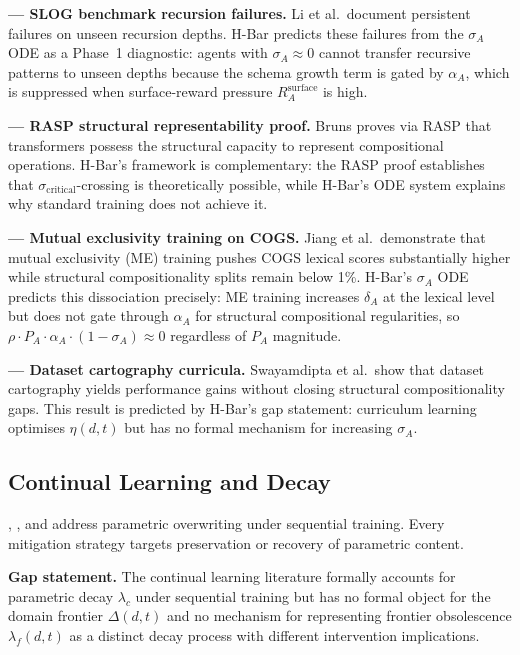 \documentclass[11pt,a4paper]{article}
\begin{document}
\textbf{\cite{li2023slogstructuralgeneralizationbenchmark} --- SLOG benchmark recursion failures.}
Li et al.\ document persistent failures on unseen recursion depths.
H-Bar predicts these failures from the $\sigma_A$ ODE as a Phase~1
diagnostic: agents with $\sigma_A \approx 0$ cannot transfer recursive
patterns to unseen depths because the schema growth term is gated by
$\alpha_A$, which is suppressed when surface-reward pressure
$R_A^{\text{surface}}$ is high.

\textbf{\cite{bruns2025exploringcompositionalgeneralizationin} --- RASP structural representability proof.}
Bruns proves via RASP that transformers possess the structural capacity
to represent compositional operations. H-Bar's framework is
complementary: the RASP proof establishes that
$\sigma_{\text{critical}}$-crossing is theoretically possible, while
H-Bar's ODE system explains why standard training does not achieve it.

\textbf{\cite{jiang2022mutualexclusivity} --- Mutual exclusivity training on COGS.}
Jiang et al.\ demonstrate that mutual exclusivity (ME) training pushes
COGS lexical scores substantially higher while structural
compositionality splits remain below 1\%. H-Bar's $\sigma_A$ ODE
predicts this dissociation precisely: ME training increases
$\delta_A$ at the lexical level but does not gate through $\alpha_A$
for structural compositional regularities, so
$\rho \cdot P_A \cdot \alpha_A \cdot (1 - \sigma_A) \approx 0$
regardless of $P_A$ magnitude.

\textbf{\cite{swayamdipta2020datasetcartography} --- Dataset cartography curricula.}
Swayamdipta et al.\ show that dataset cartography yields performance
gains without closing structural compositionality gaps. This result is
predicted by H-Bar's gap statement: curriculum learning optimises
$\eta(d,t)$ but has no formal mechanism for increasing $\sigma_A$.

\subsection{Continual Learning and Decay}\label{sec:continual-learning}

\cite{mccloskey1989catastrophicinterference},
\cite{goodfellow2013empiricalinvestigationcatastrophicforgetting}, and
\cite{kirkpatrick2017overcomingcatastrophicforgetting} address parametric
overwriting under sequential training. Every mitigation strategy targets
preservation or recovery of parametric content.

\textbf{Gap statement.} The continual learning literature formally
accounts for parametric decay $\lambda_c$ under sequential training but
has no formal object for the domain frontier $\Delta(d,t)$ and no
mechanism for representing frontier obsolescence $\lambda_f(d,t)$ as a
distinct decay process with different intervention implications.
\end{document}
